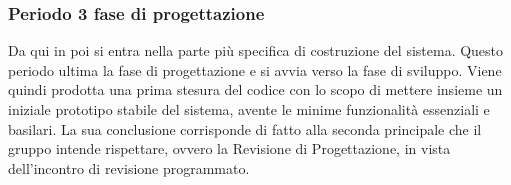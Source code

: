                 \subsubsection{Periodo 3 fase di progettazione}
        
                Da qui in poi si entra nella parte più specifica di costruzione del sistema. Questo periodo ultima la fase di progettazione e si avvia verso la fase di sviluppo. Viene quindi prodotta una prima stesura del codice con lo scopo di mettere insieme un iniziale prototipo stabile del sistema, avente le minime funzionalità essenziali e basilari. La sua conclusione corrisponde di fatto alla seconda  principale che il gruppo \Gruppo{} intende rispettare, ovvero la Revisione di Progettazione, in vista dell'incontro di revisione programmato.
        
